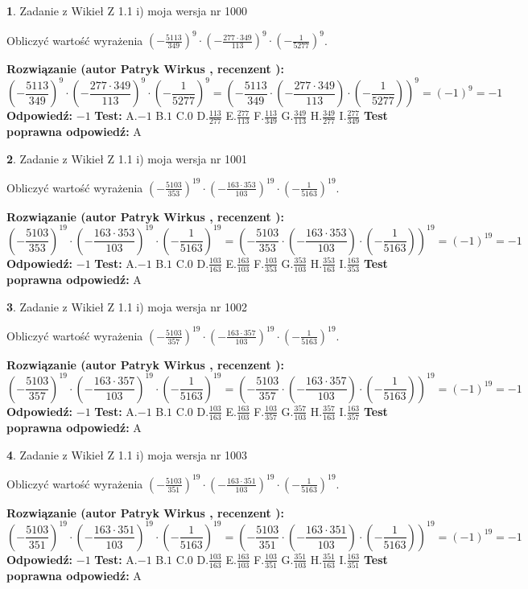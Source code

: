 \documentclass[12pt, a4paper]{article}
\theoremstyle{definition} %
\newtheorem{zad}{}
\newcommand{\zadStart}[1]{\begin{zad}#1\newline}
\newcommand{\zadStop}{\end{zad}}
\newcommand{\rozwStart}[2]{\noindent \textbf{Rozwiązanie (autor #1 , recenzent #2): }\newline}
\newcommand{\rozwStop}{\newline}
\newcommand{\odpStart}{\noindent \textbf{Odpowiedź:}\newline}
\newcommand{\odpStop}{\newline}
\newcommand{\testStart}{\noindent \textbf{Test:}\newline}
\newcommand{\testStop}{\newline}
\newcommand{\kluczStart}{\noindent \textbf{Test poprawna odpowiedź:}\newline}
\newcommand{\kluczStop}{\newline}
\begin{document}
\zadStart{Zadanie z Wikieł Z 1.1 i) moja wersja nr 1000}

Obliczyć wartość wyrażenia $(-\frac{5113}{349})^{9} \cdot (-\frac{277 \cdot 349}{113})^{9} \cdot (-\frac{1}{5277})^{9}$.
\zadStop
\rozwStart{Patryk Wirkus}{}
$$(-\frac{5113}{349})^{9} \cdot (-\frac{277 \cdot 349}{113})^{9} \cdot (-\frac{1}{5277})^{9} = (-\frac{5113}{349} \cdot (-\frac{277 \cdot 349}{113}) \cdot (-\frac{1}{5277}))^{9} = (-1)^{9} = -1$$
\rozwStop
\odpStart
$-1$
\odpStop
\testStart
A.$-1$ B.$1$ C.$0$ D.$\frac{113}{277}$ E.$\frac{277}{113}$
F.$\frac{113}{349}$ G.$\frac{349}{113}$
H.$\frac{349}{277}$
I.$\frac{277}{349}$
\testStop
\kluczStart
A
\kluczStop



\zadStart{Zadanie z Wikieł Z 1.1 i) moja wersja nr 1001}

Obliczyć wartość wyrażenia $(-\frac{5103}{353})^{19} \cdot (-\frac{163 \cdot 353}{103})^{19} \cdot (-\frac{1}{5163})^{19}$.
\zadStop
\rozwStart{Patryk Wirkus}{}
$$(-\frac{5103}{353})^{19} \cdot (-\frac{163 \cdot 353}{103})^{19} \cdot (-\frac{1}{5163})^{19} = (-\frac{5103}{353} \cdot (-\frac{163 \cdot 353}{103}) \cdot (-\frac{1}{5163}))^{19} = (-1)^{19} = -1$$
\rozwStop
\odpStart
$-1$
\odpStop
\testStart
A.$-1$ B.$1$ C.$0$ D.$\frac{103}{163}$ E.$\frac{163}{103}$
F.$\frac{103}{353}$ G.$\frac{353}{103}$
H.$\frac{353}{163}$
I.$\frac{163}{353}$
\testStop
\kluczStart
A
\kluczStop



\zadStart{Zadanie z Wikieł Z 1.1 i) moja wersja nr 1002}

Obliczyć wartość wyrażenia $(-\frac{5103}{357})^{19} \cdot (-\frac{163 \cdot 357}{103})^{19} \cdot (-\frac{1}{5163})^{19}$.
\zadStop
\rozwStart{Patryk Wirkus}{}
$$(-\frac{5103}{357})^{19} \cdot (-\frac{163 \cdot 357}{103})^{19} \cdot (-\frac{1}{5163})^{19} = (-\frac{5103}{357} \cdot (-\frac{163 \cdot 357}{103}) \cdot (-\frac{1}{5163}))^{19} = (-1)^{19} = -1$$
\rozwStop
\odpStart
$-1$
\odpStop
\testStart
A.$-1$ B.$1$ C.$0$ D.$\frac{103}{163}$ E.$\frac{163}{103}$
F.$\frac{103}{357}$ G.$\frac{357}{103}$
H.$\frac{357}{163}$
I.$\frac{163}{357}$
\testStop
\kluczStart
A
\kluczStop



\zadStart{Zadanie z Wikieł Z 1.1 i) moja wersja nr 1003}

Obliczyć wartość wyrażenia $(-\frac{5103}{351})^{19} \cdot (-\frac{163 \cdot 351}{103})^{19} \cdot (-\frac{1}{5163})^{19}$.
\zadStop
\rozwStart{Patryk Wirkus}{}
$$(-\frac{5103}{351})^{19} \cdot (-\frac{163 \cdot 351}{103})^{19} \cdot (-\frac{1}{5163})^{19} = (-\frac{5103}{351} \cdot (-\frac{163 \cdot 351}{103}) \cdot (-\frac{1}{5163}))^{19} = (-1)^{19} = -1$$
\rozwStop
\odpStart
$-1$
\odpStop
\testStart
A.$-1$ B.$1$ C.$0$ D.$\frac{103}{163}$ E.$\frac{163}{103}$
F.$\frac{103}{351}$ G.$\frac{351}{103}$
H.$\frac{351}{163}$
I.$\frac{163}{351}$
\testStop
\kluczStart
A
\kluczStop
\end{document}
